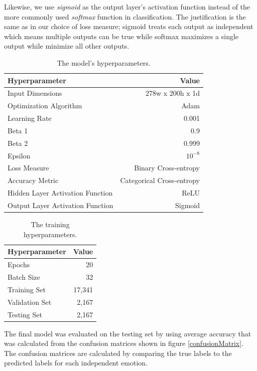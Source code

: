 \documentclass[a4paper, 10pt, conference]{ieeeconf}      %
\begin{document}
Likewise, we use \textit{sigmoid} as the output layer's activation function instead of the more commonly used \textit{softmax} function in classification. The justification is the same as in our choice of loss measure; sigmoid treats each output as independent which means multiple outputs can be true while softmax maximizes a single output while minimize all other outputs.

\begin{table}
	\centering
	\caption{The model's hyperparameters.}
	\label{modelHyperparams}
	\begin{tabular}{@{}lr@{}}
		\toprule
		Hyperparameter & Value \\
		\midrule
		Input Dimensions & 278w x 200h x 1d \\
		Optimization Algorithm & Adam \\
		Learning Rate & 0.001 \\
		Beta 1 & 0.9 \\
		Beta 2 & 0.999 \\
		Epsilon & $10^{-8}$ \\
		Loss Measure & Binary Cross-entropy \\
		Accuracy Metric & Categorical Cross-entropy \\
		Hidden Layer Activation Function & ReLU \\
		Output Layer Activation Function & Sigmoid \\
		\bottomrule
	\end{tabular}
\end{table}

\begin{table}
	\centering
	\caption{The training hyperparameters.}
	\label{trainHyperparams}
	\begin{tabular}{@{}lr@{}}
		\toprule
		Hyperparameter & Value \\
		\midrule
		Epochs & 20 \\
		Batch Size & 32 \\
		Training Set & 17,341 \\
		Validation Set & 2,167 \\
		Testing Set & 2,167 \\
		\bottomrule
	\end{tabular}
\end{table}

The final model was evaluated on the testing set by using average accuracy that was calculated from the confusion matrices shown in figure \ref{confusionMatrix}. The confusion matrices are calculated by comparing the true labels to the predicted labels for each independent emotion.
\end{document}

